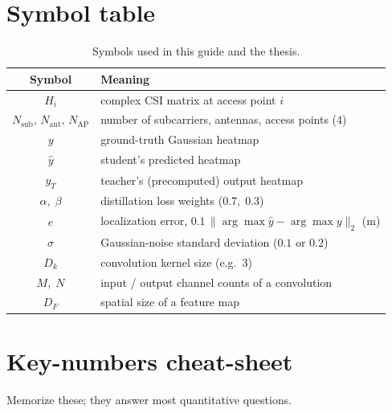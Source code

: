 \section{Symbol table}
\label{app:glossary:symbols}

\begin{table}[H]
\centering
\small
\caption{Symbols used in this guide and the thesis.}
\begin{tabular}{@{}cl@{}}
\toprule
\textbf{Symbol} & \textbf{Meaning} \\
\midrule
$H_i$ & complex CSI matrix at access point $i$ \\
$N_{\text{sub}},\,N_{\text{ant}},\,N_{\text{AP}}$ & number of subcarriers, antennas, access points (4) \\
$y$ & ground-truth Gaussian heatmap \\
$\hat{y}$ & student's predicted heatmap \\
$y_T$ & teacher's (precomputed) output heatmap \\
$\alpha,\;\beta$ & distillation loss weights ($0.7,\;0.3$) \\
$e$ & localization error, $0.1\,\lVert\arg\max\hat y-\arg\max y\rVert_2$ (m) \\
$\sigma$ & Gaussian-noise standard deviation ($0.1$ or $0.2$) \\
$D_k$ & convolution kernel size (e.g.\ 3) \\
$M,\;N$ & input / output channel counts of a convolution \\
$D_F$ & spatial size of a feature map \\
\bottomrule
\end{tabular}
\end{table}

\section{Key-numbers cheat-sheet}
\label{app:glossary:numbers}

Memorize these; they answer most quantitative questions.

